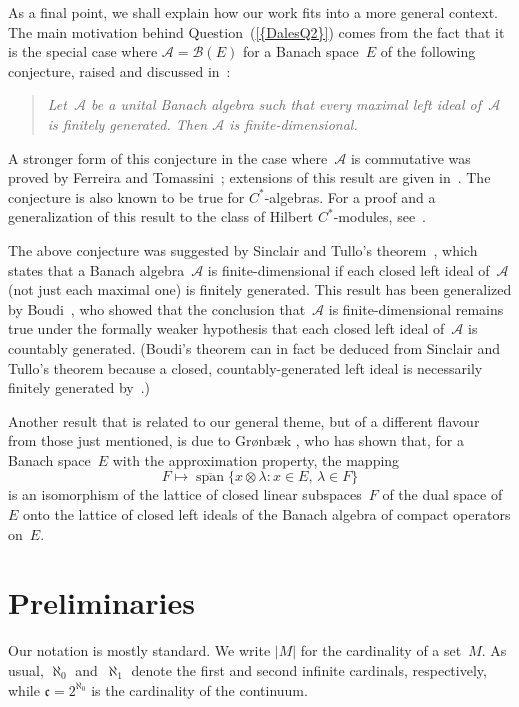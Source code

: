 \documentclass[12pt]{amsart}
\theoremstyle{definition}
\numberwithin{equation}{section}
\begin{document}
As a final point, we shall explain how our work fits into a more
general context.  The main motivation behind
Question~{{\normalfont\textrm{(\ref{{DalesQ2}})}}} comes from the fact that it is the special
case where $\mathscr{A} = \mathscr{B}(E)$ for a Banach space~$E$ of
the following conjecture, raised and discussed in~\cite{daleszelazko}:
\begin{quote}\label{DZconj}
  \textit{Let~$\mathscr{A}$ be a unital Banach algebra such that every
    maximal left ideal of~$\mathscr{A}$ is finitely generated. Then
    $\mathscr{A}$ is finite-dimensional.}
\end{quote}
A stronger form of this conjecture in the case where~$\mathscr{A}$ is
commutative was proved by Ferreira and Tomassini~\cite{ft}; extensions
of this result are given in~\cite{daleszelazko}. The conjecture is
also known to be true for $C^*$\nobreakdash-alge\-bras. For a proof
and a generalization of this result to the class of Hilbert
$C^*$\nobreakdash-modules, see~\cite{BlecherKania}.

The above conjecture was suggested by Sinclair and Tullo's
theorem~\cite{st}, which states that a Banach algebra~$\mathscr{A}$ is
finite-dimensional if each closed left ideal of~$\mathscr{A}$ (not
just each maximal one) is finitely generated.  This result has been
generalized by Boudi~\cite{boudi}, who showed that the conclusion
that~$\mathscr{A}$ is finite-dimensional remains true under the
formally weaker hypo\-thesis that each closed left ideal
of~$\mathscr{A}$ is countably generated. (Boudi's theorem can in fact
be deduced from Sinclair and Tullo's theorem because a closed,
countably-generated left ideal is necessarily finitely generated
by~\cite[Prop\-o\-si\-tion~1.5]{daleszelazko}.)

Another result that is related to our general theme, but of a
different flavour from those just mentioned, is due to Gr\o{}nb\ae{}k
\cite[Proposition~7.3]{GronbaekMorita}, who has shown that, for a
Banach space~$E$ with the approximation property, the mapping
\[ F\mapsto \overline{\operatorname{span}}\{x\otimes\lambda : x\in
E,\, \lambda\in F\} \] is an isomorphism of the lattice of closed
linear subspaces~$F$ of the dual space of~$E$ onto the lattice of
closed left ideals of the Banach algebra of compact operators on~$E$.

\section{Preliminaries}\label{SectPrelim}
\noindent
Our notation is mostly standard.  We write $|M|$ for the cardinality
of a set~$M$. As usual, $\aleph_0$ and~$\aleph_1$ denote the first and
second infinite cardinals, respectively, while $\mathfrak{c} =
2^{\aleph_0}$ is the cardinality of the continuum.
\end{document}

